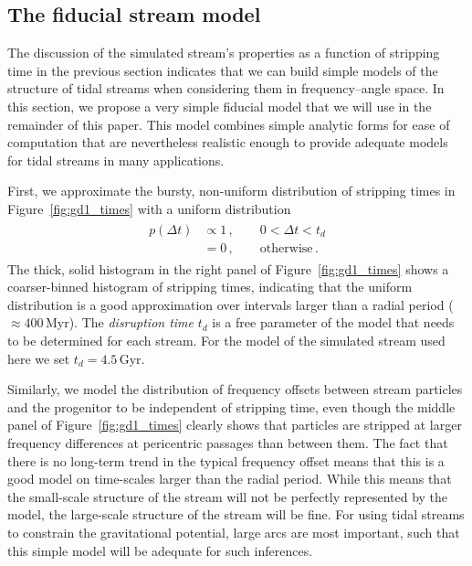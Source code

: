 \documentclass[12pt,preprint]{aastex}
\renewcommand{\figurename}{Figure}
\newcommand{\Myr}{\ensuremath{\,\mathrm{Myr}}}
\newcommand{\Gyr}{\ensuremath{\,\mathrm{Gyr}}}
\begin{document}
\subsection{The fiducial stream model}\label{sec:fidmodel}

The discussion of the simulated stream's properties as a function of
stripping time in the previous section indicates that we can build
simple models of the structure of tidal streams when considering them
in frequency--angle space. In this section, we propose a very simple
fiducial model that we will use in the remainder of this paper. This
model combines simple analytic forms for ease of computation that are
nevertheless realistic enough to provide adequate models for tidal
streams in many applications.

First, we approximate the bursty, non-uniform distribution of
stripping times in \figurename~\ref{fig:gd1_times} with a uniform
distribution
\begin{align}\label{eq:pt}
  \begin{split}
    p(\Delta t) & \propto 1\,,\qquad 0 < \Delta t < t_d\\
    & = 0\,,\qquad \mathrm{otherwise}\,.
  \end{split}
\end{align}
The thick, solid histogram in the right panel of
\figurename~\ref{fig:gd1_times} shows a coarser-binned histogram of
stripping times, indicating that the uniform distribution is a good
approximation over intervals larger than a radial period ($\approx
400\Myr$). The \emph{disruption time} $t_d$ is a free parameter of the
model that needs to be determined for each stream. For the model of
the simulated stream used here we set $t_d = 4.5\Gyr$.

Similarly, we model the distribution of frequency offsets between
stream particles and the progenitor to be independent of stripping
time, even though the middle panel of \figurename~\ref{fig:gd1_times}
clearly shows that particles are stripped at larger frequency
differences at pericentric passages than between them. The fact that
there is no long-term trend in the typical frequency offset means that
this is a good model on time-scales larger than the radial
period. While this means that the small-scale structure of the stream
will not be perfectly represented by the model, the large-scale
structure of the stream will be fine. For using tidal streams to
constrain the gravitational potential, large arcs are most important,
such that this simple model will be adequate for such inferences.
\end{document}
